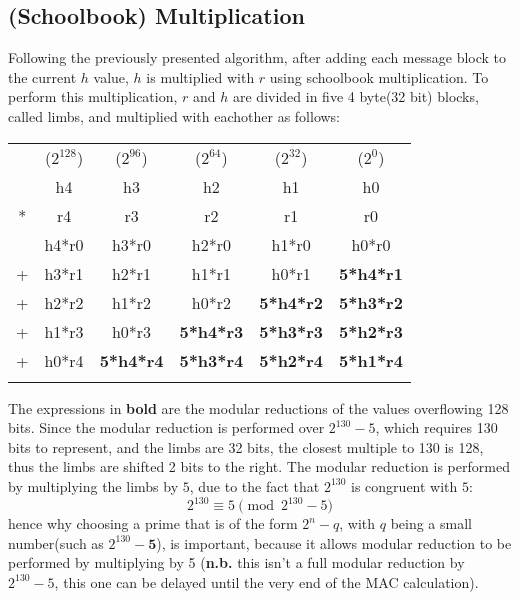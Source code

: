 \documentclass[twocolumn]{article}
\begin{document}
\subsection{(Schoolbook) Multiplication}
Following the previously presented algorithm, after adding each message block to the current $h$ value, $h$ is multiplied with $r$ using schoolbook multiplication. 
To perform this multiplication, $r$ and $h$ are divided in five 4 byte(32 bit) blocks, called limbs\label{def_limb}, and multiplied with eachother as follows:
\begin{footnotesize}
\begin{tabular}{cccccc}
\\
    & ($2^{128}$)   & ($2^{96}$)    & ($2^{64}$)    & ($2^{32}$)    & ($2^{0}$)     \\
    & h4            & h3            & h2            & h1            & h0            \\
*   & r4            & r3            & r2            & r1            & r0            \\
\hline
    & h4*r0 & h3*r0 & h2*r0 & h1*r0 & h0*r0 \\
+   & h3*r1 & h2*r1 & h1*r1 & h0*r1 & \textbf{5*h4*r1} \\
+   & h2*r2 & h1*r2 & h0*r2 & \textbf{5*h4*r2} & \textbf{5*h3*r2} \\
+   & h1*r3 & h0*r3 & \textbf{5*h4*r3} & \textbf{5*h3*r3} & \textbf{5*h2*r3} \\
+   & h0*r4 & \textbf{5*h4*r4} & \textbf{5*h3*r4} & \textbf{5*h2*r4} & \textbf{5*h1*r4}\\
    &    &    &    &    &    \\
\end{tabular}
\end{footnotesize}
The expressions in \textbf{bold} are the modular reductions of the values overflowing 128 bits. Since the modular reduction is performed over $2^{130}-5$, which requires 130 bits
to represent, and the limbs are 32 bits, the closest multiple to 130 is 128, thus the limbs are shifted 2 bits to the right. The modular reduction is performed by multiplying the
limbs by $5$, due to the fact that $2^{130}$ is congruent with $5$:
$$2^{130} \equiv 5 \pmod{2^{130}-5}$$ 
hence why choosing a prime that is of the form $2^n-q$, with $q$ being a small number(such as $2^{130}-\textbf{5}$), is important, because it allows modular reduction to be 
performed by multiplying by 5 (\textbf{n.b.} this isn't a full modular reduction by $2^{130}-5$, this one can be delayed until the very end of the MAC calculation).
\end{document}
